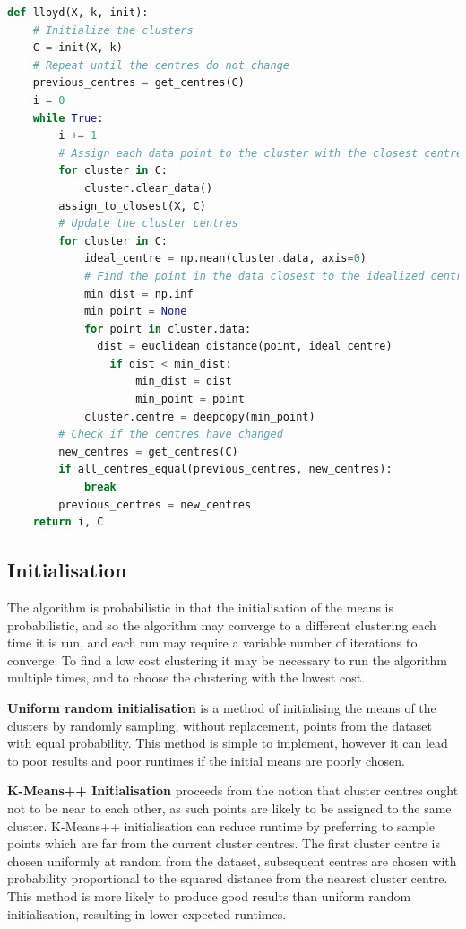 \documentclass[12pt]{article}
\begin{document}
\begin{lstlisting}[language=Python]
def lloyd(X, k, init):
    # Initialize the clusters
    C = init(X, k)
    # Repeat until the centres do not change
    previous_centres = get_centres(C)
    i = 0
    while True:
        i += 1
        # Assign each data point to the cluster with the closest centre
        for cluster in C:
            cluster.clear_data()
        assign_to_closest(X, C)
        # Update the cluster centres
        for cluster in C:
            ideal_centre = np.mean(cluster.data, axis=0)
            # Find the point in the data closest to the idealized centre
            min_dist = np.inf
            min_point = None
            for point in cluster.data:
              dist = euclidean_distance(point, ideal_centre)
                if dist < min_dist:
                    min_dist = dist
                    min_point = point
            cluster.centre = deepcopy(min_point)
        # Check if the centres have changed
        new_centres = get_centres(C)
        if all_centres_equal(previous_centres, new_centres):
            break
        previous_centres = new_centres
    return i, C
\end{lstlisting}

\subsection{Initialisation}

The algorithm is probabilistic in that the initialisation of the means is
probabilistic, and so the algorithm may converge to a different clustering each
time it is run, and each run may require a variable number of iterations to
converge. To find a low cost clustering it may be necessary to run the algorithm
multiple times, and to choose the clustering with the lowest cost. 

\textbf{Uniform random initialisation} is a method of initialising the means of the
clusters by randomly sampling, without replacement, points from the dataset with
equal probability. This method is simple to implement, however it can lead to
poor results and poor runtimes if the initial means are poorly chosen.

\textbf{K-Means++ Initialisation} proceeds from the notion that cluster centres
ought not to be near to each other, as such points are likely to be assigned to
the same cluster. K-Means++ initialisation can reduce runtime by preferring to
sample points which are far from the current cluster centres. The first cluster
centre is chosen uniformly at random from the dataset, subsequent centres are
chosen with probability proportional to the squared distance from the nearest
cluster centre. This method is more likely to produce good results than uniform
random initialisation, resulting in lower expected runtimes.
\end{document}

